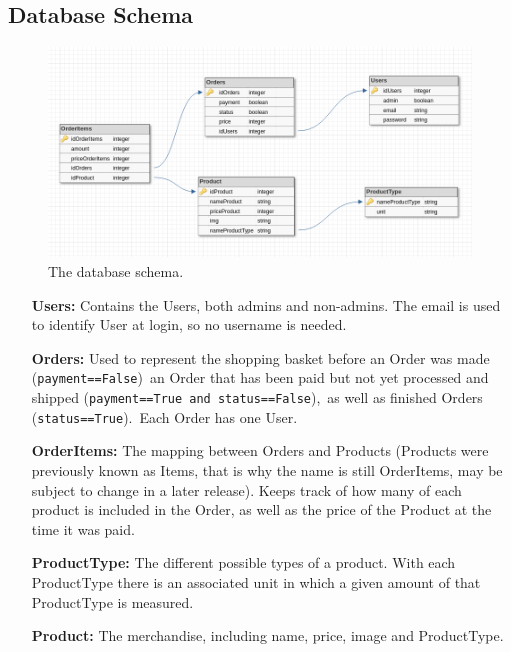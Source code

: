 \newpage

\subsection{Database Schema}

\begin{figure}[H]
  \centering
  \includegraphics[width=\textwidth]{second_sprint/db_schema.png}
  \caption{\label{fig:schema} The database schema.}
\end{figure}

\begin{itemize}
  \item[\textbf{Users:}] Contains the Users, both admins and non-admins. The
    email is used to identify User at login, so no username is needed.
  \item[\textbf{Orders:}] Used to represent the shopping basket before an
    Order was made (\texttt{payment==False})~an
    Order that has been paid but not yet processed and shipped
    (\texttt{payment==True and status==False}),~as well as finished
    Orders (\texttt{status==True}).~Each Order has one User.
  \item[\textbf{OrderItems:}] The mapping between Orders and Products
    (Products were previously known as Items, that is why the name is still
    OrderItems, may be subject to change in a later release). Keeps track
    of how many of each product is included in the Order, as well as the
    price of the Product at the time it was paid.
  \item[\textbf{ProductType:}] The different possible types of a product. With
    each ProductType there is an associated unit in which a given amount
    of that ProductType is measured.
  \item[\textbf{Product:}] The merchandise, including name, price, image and
    ProductType.
\end{itemize}
